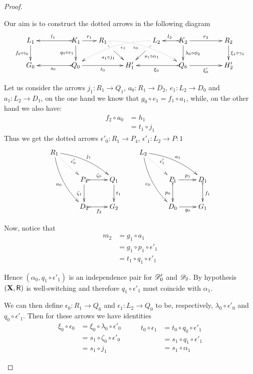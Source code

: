 \begin{proof}
\begin{enumerate}
		Our aim is to construct the dotted arrows in the following diagram
		\[\xymatrix@C=20pt@R=20pt{L_1 \ar[d]_{f_0\circ i_0}&& K_1
			\ar[d]_{q_0\circ v_1}\ar@{>->}[ll]_{l_1} \ar[r]^{r_1} & R_1
			\ar@{.>}@/^.35cm/[drrr]_(.4){\epsilon_0}|(.32)\hole
			\ar[dr]|(.33)\hole_{s_1\circ j_1} && L_2
			\ar@{.>}@/_.35cm/[dlll]^(.4){\epsilon_1}
			\ar[dl]|(.33)\hole^{s_1\circ \alpha_1}& K_2
			\ar[d]^{\lambda_0\circ \phi_2}\ar@{>->}[l]_{l_2} \ar[rr]^{r_2} &&
			R_2 \ar[d]^{\xi_1\circ \gamma_1}\\G_0 && \ar@{>->}[ll]^{s_0} Q_0
			\ar[rr]_{t_0}&& H'_1 && \ar@{>->}[ll]^{\xi_0} Q_6
			\ar[rr]_{\xi'_0}&& H'_2}\]
		
		Let us consider the arrows $j_1\colon R_1\to Q_1$, 
		$a_0\colon R_1\to D_2$, $e_1\colon L_2 \to D_0$ and $a_1\colon L_2\to D_1$, on the one hand we know that $g_0\circ e_1=f_1\circ a_1$, while, on the other hand we also have:
		\begin{align*}
			f_2\circ a_0 &=h_1 \\&=t_1\circ j_1		\end{align*}
		Thus we get the dotted arrows $\epsilon'_0\colon R_1\to P_4$, $\epsilon'_1\colon L_2\to P:1$ 
		\[\xymatrix{R_1 \ar@{.>}[dr]^{\epsilon'_0} 
			\ar@/^.3cm/[drr]^{j_1} \ar@/_.3cm/[ddr]_{a_0}&&& L_2 \ar@{.>}[dr]^{\epsilon'_1}
			\ar@/^.3cm/[drr]^{a_1} \ar@/_.3cm/[ddr]_{e_0}\\ &P_4
			\ar@{>->}[r]^{\zeta_0} \ar[d]_{\zeta_1}& Q_1 \ar[d]^{t_1} &&P_1
			\ar[r]^{p_1} \ar@{>->}[d]_{p_0}& D_1 \ar@{>->}[d]^{f_1}\\
			&D_2\ar@{>->}[r]_{f_2} & G_2& 	&D_0\ar[r]_{g_0} & G_1} \]
		
		Now, notice that
		\begin{align*}
			m_2&=g_1\circ a_1\\
			&=g_1\circ p_1\circ \epsilon'_1\\&=
		t_1\circ q_1\circ \epsilon'_1 
			\end{align*} 
	
		Hence $(\alpha_0, q_1\circ \epsilon'_1)$ is an independence pair
		for $\mathscr{D}'_0$ and $\mathscr{D}_2$. By hypothesis $(\textbf {\textup{X}}, \mathsf{R})$ is well-switching and therefore
		$q_1\circ \epsilon'_1$ must coincide with $\alpha_1$.	
		
		We can then define $\epsilon_0\colon R_1\to Q_6$ and $\epsilon_1\colon L_2\to Q_0$ to be, respectively, 
		$\lambda_0\circ \epsilon'_0$ and $q_0\circ
		\epsilon'_1$. Then for these  arrows we have  identities
		\[\begin{split}
			\xi_0\circ \epsilon_0 & =\xi_0\circ \lambda_0\circ \epsilon'_0 \\&=s_1\circ \zeta_0 \circ \epsilon'_0\\&=s_1\circ j_1
		\end{split} \qquad \begin{split}
		t_0\circ \epsilon_1 & = t_0\circ q_0\circ \epsilon'_1\\& =s_1\circ q_1\circ \epsilon'_1\\&=s_1\circ \alpha_1
		\end{split}\]
		

\end{enumerate}
\end{proof}
